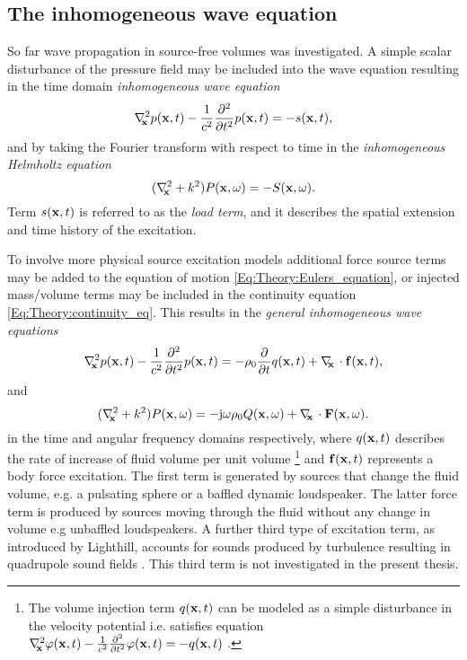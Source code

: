 \subsection{The inhomogeneous wave equation}
%
So far wave propagation in source-free volumes was investigated.
A simple scalar disturbance of the pressure field may be included into the wave equation resulting in the time domain \emph{inhomogeneous wave equation}  
\begin{equation}
\nabla^2_{\!\!\mathbf{x}} p(\mathbf{x},t) -\frac{1}{c^2}\frac{\partial^2}{\partial t^2}p(\mathbf{x},t) = -s(\mathbf{x},t),
\label{Eq:Theory:Inhomogene_wave_eq_time_domain}
\end{equation}
and by taking the Fourier transform with respect to time in the \emph{inhomogeneous Helmholtz equation}
\begin{equation}
(\nabla^2_{\!\!\mathbf{x}} + k^2 ) P(\mathbf{x},\omega ) = -S(\mathbf{x},\omega).
\end{equation}
Term $s(\mathbf{x},t)$ is referred to as the \emph{load term}, and it describes the spatial extension and time history of the excitation.

To involve more physical source excitation models additional force source terms may be added to the equation of motion \eqref{Eq:Theory:Eulers_equation}, or injected mass/volume terms may be included in the continuity equation \eqref{Eq:Theory:continuity_eq}.
This results in the \emph{general inhomogeneous wave equations} \cite{Pierce1991, Kinsler2000, Howe2007}
\begin{equation}
\nabla^2_{\!\!\mathbf{x}} p(\mathbf{x},t) -\frac{1}{c^2}\frac{\partial^2}{\partial t^2}p(\mathbf{x},t) = - \rho_0 \frac{\partial}{\partial t} q(\mathbf{x},t) + \nabla_{\!\!\mathbf{x}}\, \cdot \mathbf{f}(\mathbf{x},t),
\label{Eq:Theory:Inhomogene_wave_eq_time_domain}
\end{equation}
and
\begin{equation}
(\nabla^2_{\!\!\mathbf{x}} + k^2 ) P(\mathbf{x},\omega ) = - \mathrm{j} \omega \rho_0 Q(\mathbf{x},\omega) + \nabla_{\!\!\mathbf{x}}\, \cdot \mathbf{F}(\mathbf{x},\omega).
\label{Eq:Theory:Inhomogene_wave_eq_freq_domain}
\end{equation}
in the time and angular frequency domains respectively, where $q(\mathbf{x},t)$ describes the rate of increase of fluid volume per unit volume 
\footnote{The volume injection term $q(\mathbf{x},t)$ can be modeled as a simple disturbance in the velocity potential i.e. satisfies equation $\nabla^2_{\!\!\mathbf{x}} \varphi(\mathbf{x},t) -\frac{1}{c^2}\frac{\partial^2}{\partial t^2}\varphi(\mathbf{x},t) = -q(\mathbf{x},t)$ \cite{Jensen2007}.}
and $\mathbf{f}(\mathbf{x},t)$ represents a body force excitation.
The first term is generated by sources that change the fluid volume, e.g. a pulsating sphere or a baffled dynamic loudspeaker.
The latter force term is produced by sources moving through the fluid without any change in volume e.g unbaffled loudspeakers.
A further third type of excitation term, as introduced by Lighthill, accounts for sounds produced by turbulence resulting in quadrupole sound fields \cite{Lighthill1952, Lighthill1954, Kinsler2000}.
This third term is not investigated in the present thesis.

